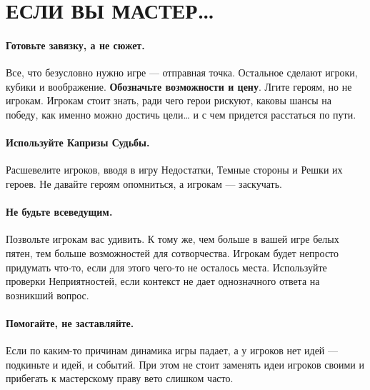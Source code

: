 \section*{ЕСЛИ ВЫ МАСТЕР…}

\paragraph{Готовьте завязку, а не сюжет.} Все, что безусловно нужно игре — отправная точка. Остальное сделают игроки, кубики и воображение. \textbf{Обозначьте возможности и цену}. Лгите героям, но не игрокам. Игрокам стоит знать, ради чего герои рискуют, каковы шансы на победу, как именно можно достичь цели… и с чем придется расстаться по пути.
\paragraph{Используйте Капризы Судьбы.} Расшевелите игроков, вводя в игру Недостатки, Темные стороны и Решки их героев. Не давайте героям опомниться, а игрокам — заскучать.
\paragraph{Не будьте всеведущим.} Позвольте игрокам вас удивить. К тому же, чем больше в вашей игре белых пятен, тем больше возможностей для сотворчества. Игрокам будет непросто придумать что-то, если для этого чего-то не осталось места. Используйте проверки Неприятностей, если контекст не дает однозначного ответа на возникший вопрос.
\paragraph{Помогайте, не заставляйте.} Если по каким-то причинам динамика игры падает, а у игроков нет идей — подкиньте и идей, и событий. При этом не стоит заменять идеи игроков своими и прибегать к мастерскому праву вето слишком часто.